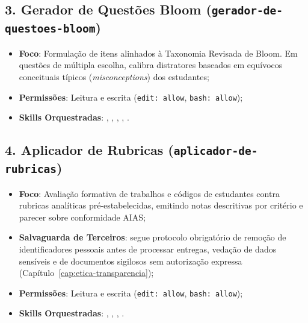 \subsection{3. Gerador de Quest{\~o}es Bloom (\texttt{gerador-de-questoes-bloom})}
\begin{itemize}
  \item \textbf{Foco}: Formula{\c c}{\~a}o de itens alinhados {\`a} Taxonomia Revisada de Bloom. Em quest{\~o}es de m{\'u}ltipla escolha, calibra distratores baseados em equ{\'i}vocos conceituais t{\'i}picos (\emph{misconceptions}) dos estudantes;
  \item \textbf{Permiss{\~o}es}: Leitura e escrita (\texttt{edit: allow}, \texttt{bash: allow});
  \item \textbf{Skills Orquestradas}: , , , , .
\end{itemize}

\subsection{4. Aplicador de Rubricas (\texttt{aplicador-de-rubricas})}
\begin{itemize}
  \item \textbf{Foco}: Avalia{\c c}{\~a}o formativa de trabalhos e c{\'o}digos de estudantes contra rubricas anal{\'i}ticas pr{\'e}-estabelecidas, emitindo notas descritivas por crit{\'e}rio e parecer sobre conformidade AIAS;
  \item \textbf{Salvaguarda de Terceiros}: segue protocolo obrigat{\'o}rio de remo{\c c}{\~a}o de identificadores pessoais antes de processar entregas, veda{\c c}{\~a}o de dados sens{\'i}veis e de documentos sigilosos sem autoriza{\c c}{\~a}o expressa (Cap{\'i}tulo~\ref{cap:etica-transparencia});
  \item \textbf{Permiss{\~o}es}: Leitura e escrita (\texttt{edit: allow}, \texttt{bash: allow});
  \item \textbf{Skills Orquestradas}: , , , .
\end{itemize}

